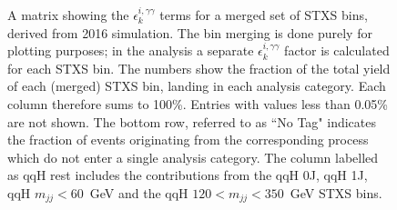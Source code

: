 \begin{figure}
  \caption[Efficiency times acceptance matrix from 2016 simulation]
  {
    A matrix showing the $\epsilon^{i,\gamma\gamma}_{k}$ terms for a merged set of STXS bins, derived from 2016 simulation. The bin merging is done purely for plotting purposes; in the analysis a separate $\epsilon^{i,\gamma\gamma}_{k}$ factor is calculated for each STXS bin. The numbers show the fraction of the total yield of each (merged) STXS bin, landing in each analysis category. Each column therefore sums to 100\%. Entries with values less than 0.05\% are not shown. The bottom row, referred to as ``No Tag" indicates the fraction of events originating from the corresponding process which do not enter a single analysis category. The column labelled as qqH rest includes the contributions from the qqH 0J, qqH 1J, qqH $m_{jj}<60$~GeV and the qqH $120<m_{jj}<350$~GeV STXS bins.
  }
  \label{fig:ea_2016}
\end{figure}

